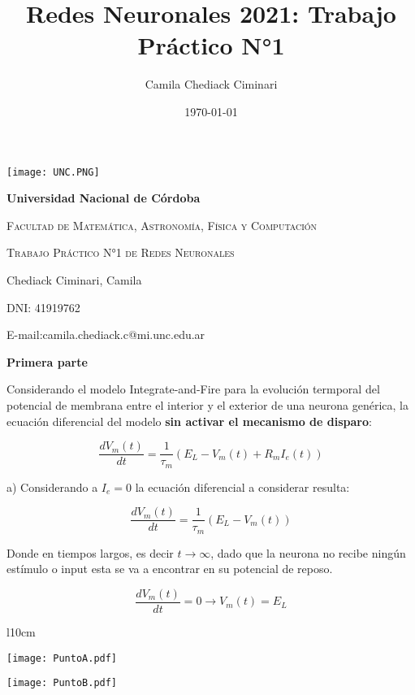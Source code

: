 \documentclass[12pt,a4paper]{article}
\author{Camila Chediack Ciminari}
\date{\today}
\title{Redes Neuronales 2021: Trabajo Práctico N°1}
\begin{document}
\begin{titlepage}

\centering
\texttt{[image: UNC.PNG]}

\vspace{1cm}
{\bfseries\LARGE Universidad Nacional de Córdoba \par}
\vspace{1cm}
{\scshape\Large Facultad de Matemática, Astronomía, Física y Computación\par}
\vspace{1cm}
{\scshape\Huge Trabajo Práctico N°1 de Redes Neuronales}
\vspace{1cm}

{\Large Chediack Ciminari, Camila }
\vspace*{0.3cm}


DNI: 41919762 \\


\vspace*{0.3cm}

E-mail:camila.chediack.c@mi.unc.edu.ar

\end{titlepage}
\begin{center}
\textbf{Primera parte}
\end{center}

Considerando el modelo Integrate-and-Fire para la evolución termporal del potencial de membrana entre el interior y el exterior de una neurona genérica, la ecuación diferencial del modelo \textbf{sin activar el mecanismo de disparo}:

\begin{equation}
\dfrac{dV_m(t)}{dt} = \dfrac{1}{\tau_m}(E_L-V_m(t)+R_m I_e(t))
\end{equation}

a) Considerando a $I_e=0$ la ecuación diferencial a considerar resulta: 

$$\dfrac{dV_m(t)}{dt} = \dfrac{1}{\tau_m}(E_L-V_m(t))$$

Donde en tiempos largos, es decir $t \rightarrow \infty$, dado que la neurona no recibe ningún estímulo o input esta se va a encontrar en su potencial de reposo. 

$$\dfrac{dV_m(t)}{dt} = 0 \rightarrow V_m(t) = E_L$$

\begin{wrapfigure}[27]{l}{10cm}
    \begin{minipage}{\linewidth}
    \centering\captionsetup[subfigure]{justification=centering}
    \texttt{[image: PuntoA.pdf]}
    \label{PuntoA.pdf}\par\vfill
    \texttt{[image: PuntoB.pdf]}
    \label{PuntoB.pdf}
\end{minipage}
\end{wrapfigure}
\end{document}
